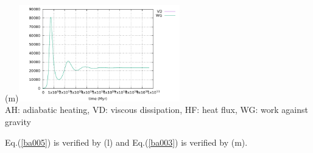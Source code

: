 \begin{center}
(m)\includegraphics[width=7cm]{python_codes/fieldstone_24/BA_104/conservation2}\\
AH: adiabatic heating, VD: viscous dissipation, HF: heat flux, WG: work against gravity
\end{center}

Eq.(\ref{ba005}) is verified by (l) and Eq.(\ref{ba003}) is verified by (m).


\newpage
